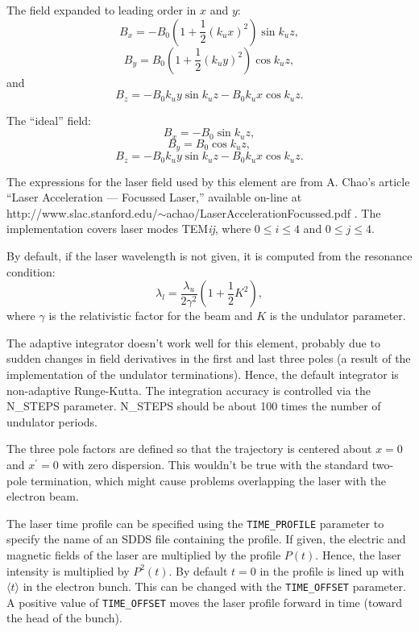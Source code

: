 \item The field expanded to leading order in $x$ and $y$:
\begin{equation}
B_x = -B_0 ( 1 + \frac{1}{2}(k_u x)^2 ) \sin k_u z,
\end{equation}
\begin{equation}
B_y = B_0 ( 1 + \frac{1}{2}(k_u y)^2 ) \cos k_u z,
\end{equation}
and
\begin{equation}
B_z = -B_0 k_u y \sin k_u z -B_0 k_u x \cos k_u z.
\end{equation}

\item The ``ideal'' field:
\begin{equation}
B_x = -B_0 \sin k_u z,
\end{equation}
\begin{equation}
B_y = B_0 \cos k_u z,
\end{equation}
\begin{equation}
B_z = -B_0 k_u y \sin k_u z -B_0 k_u x \cos k_u z.
\end{equation}


The expressions for the laser field used by this element are from
A. Chao's article ``Laser Acceleration --- Focussed Laser,'' available
on-line at \\
http://www.slac.stanford.edu/$\sim$achao/LaserAccelerationFocussed.pdf .
The implementation covers laser modes TEM{\em ij}, where
$0\leq i \leq 4$ and $0 \leq j \leq 4$.

By default, if the laser wavelength is not given, it is computed from the resonance
condition:
\begin{equation}
\lambda_l = \frac{\lambda_u}{2 \gamma^2} \left( 1 + \frac{1}{2} K^2 \right),
\end{equation}
where $\gamma$ is the relativistic factor for the beam and $K$ is the
undulator parameter.

The adaptive integrator doesn't work well for this element, probably
due to sudden changes in field derivatives in the first and last three
poles (a result of the implementation of the undulator terminations).
Hence, the default integrator is non-adaptive Runge-Kutta.  The
integration accuracy is controlled via the N\_STEPS parameter.
N\_STEPS should be about 100 times the number of undulator periods.

The three pole factors are defined so that the trajectory is centered
about $x=0$ and $x^\prime=0$ with zero dispersion.  This wouldn't be
true with the standard two-pole termination, which might cause problems 
overlapping the laser with the electron beam.

The laser time profile can be specified using the \verb|TIME_PROFILE|
parameter to specify the name of an SDDS file containing the
profile.   If given, the electric and magnetic fields of the laser are
multiplied by the profile $P(t)$.  Hence, the laser intensity is multiplied
by $P^2(t)$. By default $t=0$ in the
profile is lined up with $\langle t \rangle$ in the electron bunch.
This can be changed with the \verb|TIME_OFFSET| parameter. A positive
value of \verb|TIME_OFFSET| moves the laser profile forward in time (toward
the head of the bunch).
